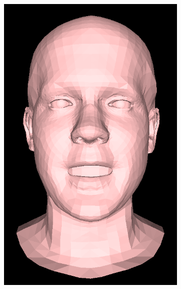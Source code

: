 \begin{figure}[h]
\begin{subfigure}[b]{0.24\textwidth}
        \includegraphics[width=\textwidth]{figures/blendshape_interp/1/00002.png}
    \end{subfigure}
    \begin{subfigure}[b]{0.24\textwidth}

\end{subfigure}
\end{figure}
